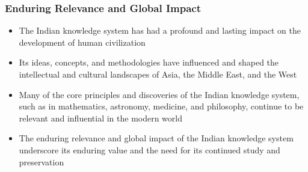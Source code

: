 \begin{frame}[fragile]\frametitle{Enduring Relevance and Global Impact}
    \begin{itemize}
        \item The Indian knowledge system has had a profound and lasting impact on the development of human civilization
        \item Its ideas, concepts, and methodologies have influenced and shaped the intellectual and cultural landscapes of Asia, the Middle East, and the West
        \item Many of the core principles and discoveries of the Indian knowledge system, such as in mathematics, astronomy, medicine, and philosophy, continue to be relevant and influential in the modern world
        \item The enduring relevance and global impact of the Indian knowledge system underscore its enduring value and the need for its continued study and preservation
    \end{itemize}
\end{frame}
